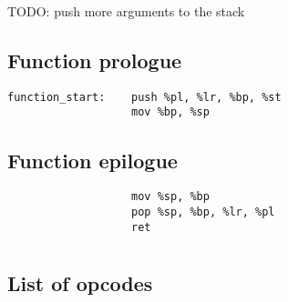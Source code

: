 \documentclass{article}
\begin{document}
TODO: push more arguments to the stack

\subsection{Function prologue}

\begin{lstlisting}
function_start:    push %pl, %lr, %bp, %st
                   mov %bp, %sp
\end{lstlisting}

\subsection{Function epilogue}

\begin{lstlisting}
                   mov %sp, %bp
                   pop %sp, %bp, %lr, %pl
                   ret
\end{lstlisting}

\appendix
\section{\appendixname}

\subsection{List of opcodes}

\end{document}
